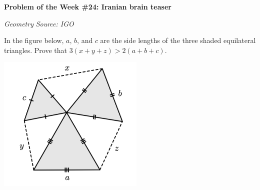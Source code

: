 \begin{potw}\vspace{5pt}
{\large\textbf{Problem of the Week \#24: Iranian brain teaser}}\vspace{5pt}

\textit{Geometry}\newline
\textit{Source: IGO}\V

In the figure below, $a$, $b$, and $c$ are the side lengths of the three shaded equilateral triangles. Prove that $3(x+y+z) > 2(a+b+c)$.\V

\begin{center}
\includegraphics[width=7cm]{Screen Shot 2022-01-01 at 1.58.00 AM.png}
\end{center}
\end{potw}\V


